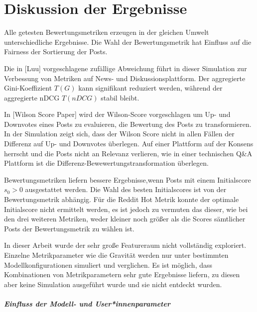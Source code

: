 \chapter{Diskussion der Ergebnisse}

Alle getesten Bewertungsmetriken erzeugen in der gleichen Umwelt unterschiedliche Ergebnisse. Die Wahl der Bewertungsmetrik hat Einfluss auf die Fairness der Sortierung der Posts.



Die in [Luu] vorgeschlagene zufällige Abweichung führt in dieser Simulation zur Verbessung von Metriken auf News- und Diskussionsplattform. Der aggregierte Gini-Koeffizient $T(G)$ kann signifikant reduziert werden, während der aggregierte nDCG $T(nDCG)$ stabil bleibt.

In [Wilson Score Paper] wird der Wilson-Score vorgeschlagen um Up- und Downvotes eines Posts zu evaluieren, die Bewertung des Posts zu transformieren. In der Simulation zeigt sich, dass der Wilson Score nicht in allen Fällen der Differenz auf Up- und Downvotes überlegen. Auf einer Plattform auf der Konsens herrscht und die Posts nicht an Relevanz verlieren, wie in einer technischen Q\&A Plattform ist die Differenz-Bewewertungstransformation überlegen.

Bewertungsmetriken liefern bessere Ergebnisse,wenn Posts mit einem Initialscore $s_0 > 0$ ausgestattet werden. Die Wahl des besten Initialscores ist von der Bewertungsmetrik abhängig. Für die Reddit Hot Metrik konnte der optimale Initialscore nicht ermittelt werden, es ist jedoch zu vermuten das dieser, wie bei den drei weiteren Metriken, weder kleiner noch größer als die Scores sämtlicher Posts der Bewertungsmetrik zu wählen ist.

In dieser Arbeit wurde der sehr große Featureraum nicht vollständig exploriert. Einzelne Metrikparameter wie die Gravität werden nur unter bestimmten Modellkonfigurationen simuliert und verglichen. Es ist möglich, dass Kombinationen von Metrikparametern sehr gute Ergebnisse liefern, zu diesen aber keine Simulation ausgeführt wurde und sie nicht entdeckt wurden. 





\paragraph{Einfluss der Modell- und User*innenparameter}

